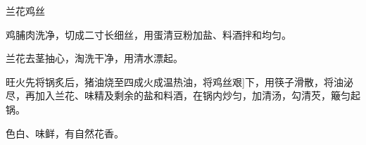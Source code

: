 \begin{recipe}{兰花鸡丝}

\ingredients


\preparation

\step 鸡脯肉洗净，切成二寸长细丝，用蛋清豆粉加盐、料酒拌和均匀。

\step 兰花去茎抽心，淘洗干净，用清水漂起。

\step 旺火先将锅炙后，猪油烧至四成火成温热油，将鸡丝艰]下，用筷子滑散，将油泌
尽，再加入兰花、味精及剩余的盐和料酒，在锅内炒匀，加清汤，勾清芡，簸匀起锅。

\features

色白、味鲜，有自然花香。

\end{recipe}

